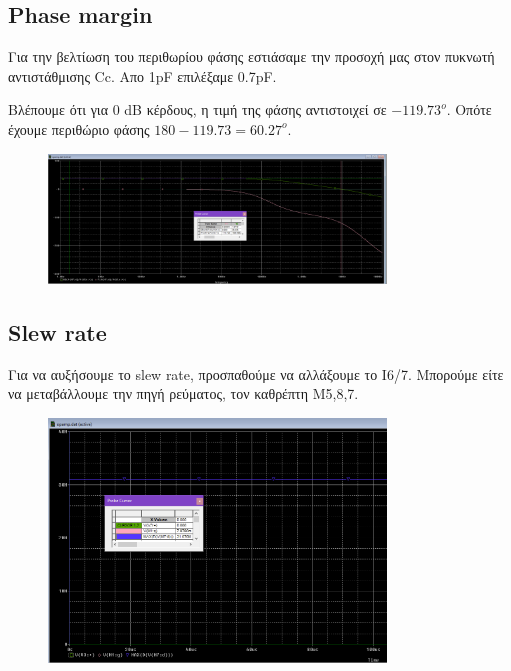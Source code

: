 \documentclass[12pt, a4paper]{article}
\begin{document}
\subsection{Phase margin}

Για την βελτίωση του περιθωρίου φάσης εστιάσαμε την προσοχή μας στον πυκνωτή αντιστάθμισης Cc. Απο 1pF επιλέξαμε 0.7pF.

Βλέπουμε ότι για 0 dB κέρδους, η τιμή της φάσης αντιστοιχεί σε $-119.73^o$. Οπότε έχουμε περιθώριο φάσης $180 - 119.73 = 60.27^ο$.

\begin{figure}[h!]
	\centering
	\includegraphics[width = 0.8\textwidth, height = .3\textheight, keepaspectratio]{assets/phase_margin_tuned.png}
\end{figure}

\subsection{Slew rate}

Για να αυξήσουμε το slew rate, προσπαθούμε να αλλάξουμε το Ι6/7. Μπορούμε είτε να μεταβάλλουμε την πηγή ρεύματος, τον καθρέπτη Μ5,8,7.

\begin{figure}[h!]
	\centering
	\includegraphics[width = 0.8\textwidth, height = .3\textheight, keepaspectratio]{assets/slew_rate_tuned.png}
\end{figure}
\end{document}
